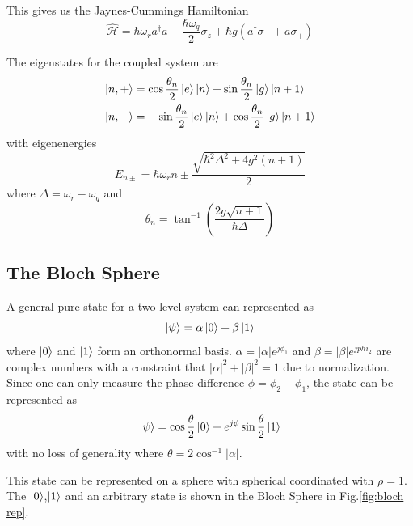 This gives us the Jaynes-Cummings Hamiltonian
\begin{equation}
\hat{\mathcal{H}}=\hbar\omega_ra^\dag a-\frac{\hbar\omega_q}{2}\sigma_z+\hbar g(a^\dag\sigma_-+a\sigma_+)
\end{equation}

The eigenstates for the coupled system are
\begin{subequations}
\label{eqn:coupled eigenstates}
\begin{align}
\ket{n,+} &= \cos\frac{\theta_n}{2}\ket{e}\ket{n}+\sin\frac{\theta_n}{2}\ket{g}\ket{n+1}\\
\ket{n,-} &= -\sin\frac{\theta_n}{2}\ket{e}\ket{n}+\cos\frac{\theta_n}{2}\ket{g}\ket{n+1}
\end{align}
\end{subequations}
with eigenenergies
\begin{equation}
E_{n\pm}=\hbar\omega_r n\pm\frac{\sqrt{\hbar^2\Delta^2+4g^2(n+1)}}{2}
\end{equation}
where $\Delta=\omega_r-\omega_q$ and
\begin{equation}
\theta_n = \tan^{-1}\left(\frac{2g\sqrt{n+1}}{\hbar \Delta}\right)
\end{equation}

\subsection{The Bloch Sphere}

A general pure state for a two level system can represented as
\begin{equation}
\ket{\psi} = \alpha\ket{0}+\beta\ket{1}
\end{equation}
where $\ket{0}$ and $\ket{1}$ form an orthonormal basis. $\alpha=|\alpha|e^{j\phi_1}$ and $\beta=|\beta|e^{jphi_2}$ are complex numbers with a constraint that $|\alpha|^2+|\beta|^2 = 1$ due to normalization. Since one can only measure the phase difference $\phi = \phi_2-\phi_1$, the state can be represented as
\begin{equation}
\ket{\psi} = \cos\frac{\theta}{2}\ket{0}+e^{j\phi}\sin\frac{\theta}{2}\ket{1}
\end{equation}
with no loss of generality where $\theta= 2\cos^{-1}|\alpha|$.

This state can be represented on a sphere with spherical coordinated with $\rho = 1$. The $\ket{0}$,$\ket{1}$ and an arbitrary state is shown in the Bloch Sphere in Fig.\ref{fig:bloch rep}.


